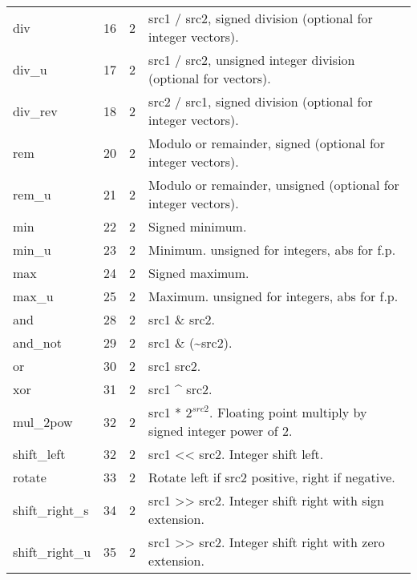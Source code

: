 \documentclass[forwardcom.tex]{subfiles}
\begin{document}
\begin{longtable} {|p{25mm}|p{12mm}|p{12mm}|p{100mm}|}
div          & 16 & 2 & src1 / src2, signed division (optional for integer vectors). \\
div\_u       & 17 & 2 & src1 / src2, unsigned integer division (optional for vectors). \\
div\_rev     & 18 & 2 & src2 / src1, signed division (optional for integer vectors). \\
rem          & 20 & 2 & Modulo or remainder, signed (optional for integer vectors). \\
rem\_u       & 21 & 2 & Modulo or remainder, unsigned (optional for integer vectors). \\
min          & 22 & 2 & Signed minimum. \\
min\_u       & 23 & 2 & Minimum. unsigned for integers, abs for f.p. \\
max          & 24 & 2 & Signed maximum. \\
max\_u       & 25 & 2 & Maximum. unsigned for integers, abs for f.p. \\
and          & 28 & 2 & src1 \& src2. \\
and\_not     & 29 & 2 & src1 \& (\~{}src2). \\
or           & 30 & 2 & src1 \textbar{} src2. \\
xor          & 31 & 2 & src1 \^{} src2. \\
mul\_2pow    & 32 & 2 & src1 * $2^{src2}$. Floating point multiply by signed integer power of 2. \\
shift\_left  & 32 & 2 & src1 \textless\textless{} src2. Integer shift left. \\
rotate       & 33 & 2 & Rotate left if src2 positive, right if negative. \\
shift\_right\_s & 34 & 2 & src1 \textgreater\textgreater{} src2. Integer shift right with sign extension. \\
shift\_right\_u & 35 & 2 & src1 \textgreater\textgreater{} src2. Integer shift right with zero extension. \\


\end{longtable}
\end{document}
